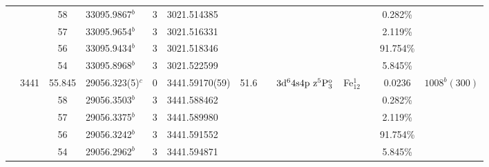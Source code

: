 \begin{table*}
\begin{center}
{\begin{tabular}{:l;l;c;l;c;l;c;l;l;c;c;c;c}
\rowstyle{\itshape}               &        & 58        & 33095.9867$^{b}$                 & 3 &   3021.514385      &      & $                                        $ & $                                        $ &             &              & 0.282\%   & $     ^{}     $\\
\rowstyle{\itshape}               &        & 57        & 33095.9654$^{b}$                 & 3 &   3021.516331      &      & $                                        $ & $                                        $ &             &              & 2.119\%   & $     ^{}     $\\
\rowstyle{\itshape}               &        & 56        & 33095.9434$^{b}$                 & 3 &   3021.518346      &      & $                                        $ & $                                        $ &             &              & 91.754\%  & $     ^{}     $\\
\rowstyle{\itshape}               &        & 54        & 33095.8968$^{b}$                 & 3 &   3021.522599      &      & $                                        $ & $                                        $ &             &              & 5.845\%   & $     ^{}     $\\
                                  & 3441   & 55.845    & 29056.323(5)$^{c}$               & 0 &    3441.59170(59)  & 51.6 & $                                        $ & $3\rm{d}^64\rm{s}4\rm{p~z}^5\rm{P}_{3}^{\rm o}$ & Fe$^1_{12}$ &              & 0.0236    & $ 1008^{b}(300)$\\
\rowstyle{\itshape}               &        & 58        & 29056.3503$^{b}$                 & 3 &   3441.588462      &      & $                                        $ & $                                        $ &             &              & 0.282\%   & $     ^{}     $\\
\rowstyle{\itshape}               &        & 57        & 29056.3375$^{b}$                 & 3 &   3441.589980      &      & $                                        $ & $                                        $ &             &              & 2.119\%   & $     ^{}     $\\
\rowstyle{\itshape}               &        & 56        & 29056.3242$^{b}$                 & 3 &   3441.591552      &      & $                                        $ & $                                        $ &             &              & 91.754\%  & $     ^{}     $\\
\rowstyle{\itshape}               &        & 54        & 29056.2962$^{b}$                 & 3 &   3441.594871      &      & $                                        $ & $                                        $ &             &              & 5.845\%   & $     ^{}     $\\

\end{tabular}}
\end{center}
\end{table*}
